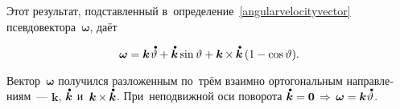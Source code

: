 \begin{otherlanguage}{russian}
Этот результат, подставленный в~определение~\eqref{angularvelocityvector} псевдо\-вектора~$\bm{\omega}$, даёт

\nopagebreak\vspace{-0.5em}\begin{equation}
\bm{\omega} = \bm{k} \hspace{0.2ex} \mathdotabove{\vartheta}
+ \mathdotabove{\bm{k}} \operatorname{sin} \vartheta
+ \bm{k} \hspace{-0.1ex}\times\hspace{-0.1ex} \mathdotabove{\bm{k}} \left( 1 - \operatorname{cos} \vartheta \right) \hspace{-0.4ex}.
\end{equation}

\vspace{-0.32em} \noindent Вектор~$\bm{\omega}$ получился разложенным по~трём взаимно ортогональным направлениям~--- $\bm{k}$, $\mathdotabove{\bm{k}}$ и~${\bm{k} \hspace{-0.1ex}\times\hspace{-0.1ex} \mathdotabove{\bm{k}}}$. При~неподвижной оси поворота ${\mathdotabove{\bm{k}} = \bm{0} \,\Rightarrow\, \bm{\omega} = \bm{k} \hspace{0.1ex} \mathdotabove{\vartheta}}$.


\end{otherlanguage}
